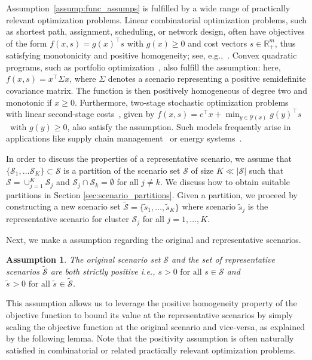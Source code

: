 \documentclass{article}
\newtheorem{assumption}[theorem]{Assumption}
\newcommand{\mY}{\mathcal{Y}}
\newcommand{\mS}{\mathcal{S}}
\newcommand{\R}{\mathbb{R}}
\newcommand{\tS}{\tilde{\mS}}
\newcommand{\newscen}[1]{\tilde{s}_{#1}}%
\begin{document}
Assumption~\ref{assump:func_assumps} is fulfilled by a wide range of practically relevant optimization problems. Linear combinatorial optimization problems, such as shortest path, assignment, scheduling, or network design, often have objectives of the form \(f(x, s) = g(x)^\top s\) with \(g(x) \geq 0\) and cost vectors \(s \in \R^m_+\), thus satisfying monotonicity and positive homogeneity; see, e.g.,~\cite{network_flow, wolsey}. Convex quadratic programs, such as portfolio optimization~\cite{portfolio}, also fulfill the assumption: here, \(f(x, s) = x^\top \Sigma x\), where \(\Sigma\) denotes a scenario representing a positive semidefinite covariance matrix. The function is then positively homogeneous of degree two and monotonic if \(x \geq 0\). Furthermore, two-stage stochastic optimization problems with linear second-stage costs~\cite{birge2011introduction}, given by \(f(x,s) = c^\top x + \min_{y \in \mY(x)} g(y)^\top s\)\ with \(g(y) \geq 0\), also satisfy the assumption. Such models frequently arise in applications like supply chain management~\cite{nagar2008supply} or energy systems~\cite{AIGNER2022318}.


	

In order to discuss the properties of a representative scenario, we
assume that \(\{\mS_1,\ldots \mS_K\}\subset\mS\) is a partition
of the scenario set \(\mS\) of size \(K\ll |\mS|\) such that
\(\mS=\cup_{j=1}^K \mS_j\) and \(\mS_{j}\cap \mS_{k} =\emptyset\) for
all \(j\neq k\).
We discuss how to obtain suitable partitions in Section \ref{sec:scenario_partitions}.
Given a partition, we proceed by constructing a new scenario set \(\tS =\{\newscen{1},\ldots, \newscen{K}\}\) where scenario \(\newscen{j}\) is the representative scenario for cluster \(\mS_{j}\) for all \(j=1,\ldots, K\).

Next, we make a assumption regarding the original and representative scenarios. %

\begin{assumption}
	\label{assump:pos_scenario_sets}
	The original scenario set \(\mS\) and the set of representative scenarios \(\tS\) are both strictly positive i.e., \(s > 0 \text{ for all } s \in \mS\) and \(\newscen{} > 0 \text{ for all } \newscen{} \in \tS\).
\end{assumption}
%
This assumption allows us to leverage the positive homogeneity property of the objective function to bound its value at the representative scenarios by simply scaling the objective function at the original scenario and vice-versa, as explained by the following lemma.
Note that the positivity assumption is often naturally satisfied in combinatorial or related practically relevant optimization problems.
\end{document}
